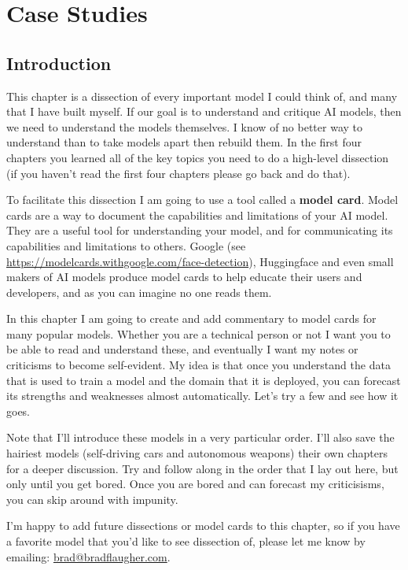 \setchapterpreamble[u]{\margintoc}
\chapter{Case Studies}


\section{Introduction}

This chapter is a dissection of every important model I could think of, and many that I have built myself. If our goal is to understand and critique AI models, then we need to understand the models themselves. I know of no better way to understand than to take models apart then rebuild them. In the first four chapters you learned all of the key topics you need to do a high-level dissection (if you haven't read the first four chapters please go back and do that). 

To facilitate this dissection I am going to use a tool called a \textbf{model card}. Model cards are a way to document the capabilities and limitations of your AI model. They are a useful tool for understanding your model, and for communicating its capabilities and limitations to others. Google (see \url{https://modelcards.withgoogle.com/face-detection}), Huggingface and even small makers of AI models produce model cards to help educate their users and developers, and as you can imagine no one reads them. 

In this chapter I am going to create and add commentary to model cards for many popular models. Whether you are a technical person or not I want you to be able to read and understand these, and eventually I want my notes or criticisms to become self-evident. My idea is that once you understand the data that is used to train a model and the domain that it is deployed, you can forecast its strengths and weaknesses almost automatically. Let's try a few and see how it goes.

Note that I'll introduce these models in a very particular order. I'll also save the hairiest models (self-driving cars and autonomous weapons) their own chapters for a deeper discussion. Try and follow along in the order that I lay out here, but only until you get bored. Once you are bored and can forecast my criticisisms, you can skip around with impunity.

I'm happy to add future dissections or model cards to this chapter, so if you have a favorite model that you'd like to see dissection of, please let me know by emailing: \href{mailto:brad@bradflaugher.com}{brad@bradflaugher.com}.

